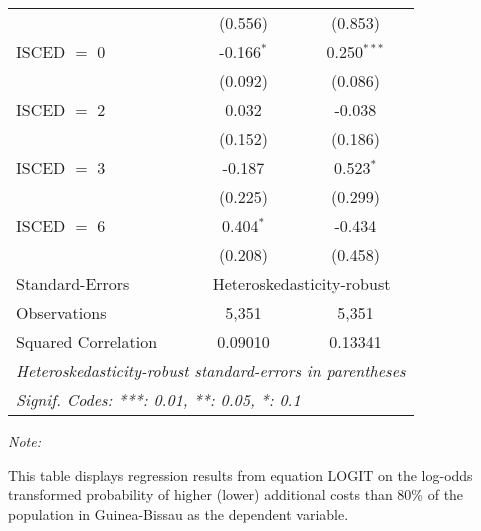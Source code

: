 \begin{table}[htbp!]
\begin{adjustbox}{width = 1\textwidth, max height = 0.95\textheight, center}
\begin{threeparttable}[b]
\begin{tabular}{lcc}
                                 & (0.556)        & (0.853)\\   
            ISCED $=$ 0          & -0.166$^{*}$   & 0.250$^{***}$\\   
                                 & (0.092)        & (0.086)\\   
            ISCED $=$ 2          & 0.032          & -0.038\\   
                                 & (0.152)        & (0.186)\\   
            ISCED $=$ 3          & -0.187         & 0.523$^{*}$\\   
                                 & (0.225)        & (0.299)\\   
            ISCED $=$ 6          & 0.404$^{*}$    & -0.434\\   
                                 & (0.208)        & (0.458)\\   
            \midrule 
            Standard-Errors & \multicolumn{2}{c}{Heteroskedasticity-robust} \\ 
            Observations         & 5,351          & 5,351\\  
            Squared Correlation  & 0.09010        & 0.13341\\  
            \midrule \midrule
            \multicolumn{3}{l}{\emph{Heteroskedasticity-robust standard-errors in parentheses}}\\
            \multicolumn{3}{l}{\emph{Signif. Codes: ***: 0.01, **: 0.05, *: 0.1}}\\
         \end{tabular}
         
         \begin{tablenotes}\item \medskip \textit{Note:}
            \item This table displays regression results from equation LOGIT on the log-odds transformed probability of higher (lower) additional costs than 80\% of the population in Guinea-Bissau as the dependent variable. 
         \end{tablenotes}
      \end{threeparttable}
   \end{adjustbox}
\end{table}


